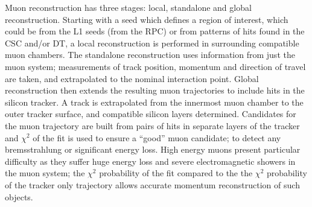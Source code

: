 Muon reconstruction has three stages: local, standalone and global reconstruction.
Starting with a seed which defines a region of interest, which could be from the L1 seeds (from the \ac{RPC}) or from patterns of hits found in the \ac{CSC} and/or \ac{DT},
a local reconstruction is performed in surrounding compatible muon chambers.
The standalone reconstruction uses information from just the muon system;
measurements of track position, momentum and direction of travel are taken, and extrapolated to the nominal interaction point. 
Global reconstruction then extends the resulting muon trajectories to include hits in the silicon tracker. A track is extrapolated from the innermost muon chamber to the outer tracker surface, and compatible silicon layers determined.
Candidates for the muon trajectory are built from pairs of hits in separate layers of the tracker 
and $\chi^{2}$ of the fit is used to ensure a ``good'' muon candidate; to detect any bremsstrahlung or significant energy loss. 
High energy muons present particular difficulty as they suffer huge energy loss and severe electromagnetic showers in the muon system; the $\chi^{2}$ probability of the fit compared to the the $\chi^{2}$ probability of the tracker only trajectory allows accurate momentum reconstruction of such objects. 








